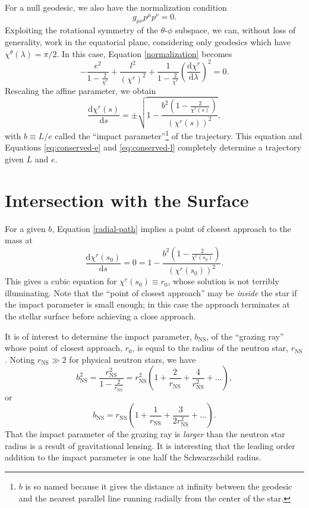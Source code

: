 \documentclass[modern]{aastex631}
\newcommand{\dd}{\mathrm{d}}
\newcommand{\bNS}{b_\mathrm{NS}}
\newcommand{\rNS}{r_\mathrm{NS}}
\begin{document}
For a null geodesic, we also have the normalization condition 
\begin{equation}
\label{normalization}
g_{\mu \nu} p^\mu p^\nu = 0.
\end{equation}
Exploiting the rotational symmetry of the $\theta$-$\phi$ subspace, we can,
without loss of generality, work in the equatorial plane, considering only
geodesics which have $\chi^\theta (\lambda) = \pi /2$.  In this case, Equation
\ref{normalization} becomes
\begin{equation}
    \label{eq:pr-normalization}
-\frac{e^2}{1 - \frac{2}{\chi^r}} + \frac{l^2}{(\chi^r)^2} + \frac{1}{1-\frac{2}{\chi^r}} \left( \frac{\dd \chi^r}{\dd \lambda} \right)^2 = 0.
\end{equation}
Rescaling the affine parameter, we obtain
\begin{equation}
\label{radial-path}
\frac{\dd \chi^r(s)}{\dd s} = \pm \sqrt{1 - \frac{b^2\left(1 - \frac{2}{\chi^r(s)} \right)}{(\chi^r(s))^2}},
\end{equation}
with $b \equiv L/e$ called the ``impact parameter''\footnote{$b$ is so named
because it gives the distance at infinity between the geodesic and the nearest
parallel line running radially from the center of the star.} of the trajectory.
This equation and Equations \ref{eq:conserved-e} and \ref{eq:conserved-l}
completely determine a trajectory given $L$ and $e$.  

\section{Intersection with the Surface}
\label{sec:surface}

For a given $b$, Equation \ref{radial-path} implies a point of closest approach
to the mass at 
\begin{equation}
\frac{\dd \chi^r(s_0)}{\dd s} = 0 = 1 - \frac{b^2 \left( 1 - \frac{2}{\chi^r\left(s_0\right)} \right)}{(\chi^r(s_0))^2}.
\end{equation}
This gives a cubic equation for $\chi^r(s_0)\equiv r_0$, whose solution is not
terribly illuminating.  Note that the ``point of closest approach'' may be
\emph{inside} the star if the impact parameter is small enough; in this case the
approach terminates at the stellar surface before achieving a close approach.

It is of interest to determine the impact parameter, $\bNS$, of the ``grazing
ray'' whose point of closest approach, $r_0$, is equal to the radius of the
neutron star, $\rNS$.  Noting $\rNS \gg 2$ for physical neutron stars, we have 
\begin{equation}
     \bNS^2 = \frac{\rNS^2}{1 - \frac{2}{\rNS}} = \rNS^2 \left( 1 + \frac{2}{\rNS} + \frac{4}{\rNS^2} + \ldots \right),
\end{equation}
or 
\begin{equation}
    \bNS = \rNS \left( 1 + \frac{1}{\rNS} + \frac{3}{2 \rNS^2} + \ldots \right).
\end{equation}
That the impact parameter of the grazing ray is \emph{larger} than the neutron
star radius is a result of gravitational lensing.  It is interesting that the
leading order addition to the impact parameter is one half the Schwarzschild
radius.
\end{document}
